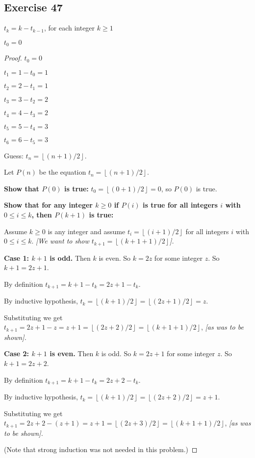 \documentclass[14pt]{extarticle}
\newcommand{\dps}{\displaystyle}
\newcommand{\floor}[1]{{\left\lfloor#1\right\rfloor}}
\begin{document}
\subsection{Exercise 47}
\(t_k = k - t_{k-1}\), for each integer \(k \geq 1\)

\(t_0 = 0\)

\begin{proof}
    \(t_0 = 0\)

    \(t_1 = 1 - t_0 = 1\)

    \(t_2 = 2 - t_1 = 1\)

    \(t_3 = 3 - t_2 = 2\)

    \(t_4 = 4 - t_3 = 2\)

    \(t_5 = 5 - t_4 = 3\)

    \(t_6 = 6 - t_5 = 3\)

    Guess: \(t_n = \floor{(n+1)/2}\).

    Let \(P(n)\) be the equation \(t_n = \floor{(n+1)/2}\).

        {\bf Show that $P(0)$ is true:} \(t_0 = \floor{(0+1)/2} = 0\), so $P(0)$ is true.

        {\bf Show that for any integer \(k \geq 0\) if $P(i)$ is true for all integers $i$ with \(0 \leq i \leq k\), then
            $P(k+1)$ is true:}

    Assume \(k \geq 0\) is any integer and assume \(t_i = \floor{(i+1)/2}\) for all integers $i$ with
    \(0 \leq i \leq k\). {\it [We want to show \(t_{k+1} = \floor{(k+1+1)/2}\)].}

        {\bf Case 1: $k+1$ is odd.} Then $k$ is even. So $k = 2z$ for some integer $z$. So $k+1 = 2z+1$.

    By definition \(t_{k+1} = k+1 - t_k = 2z+1 - t_k\).

    By inductive hypothesis, \(\dps t_k = \floor{(k+1)/2} = \floor{(2z+1)/2} = z\).

    Substituting we get \(\dps t_{k+1} = 2z+1 - z = z+1 = \floor{(2z+2)/2} = \floor{(k+1+1)/2}\),
    {\it [as was to be shown].}

        {\bf Case 2: $k+1$ is even.} Then $k$ is odd. So $k = 2z+1$ for some integer $z$. So $k+1 = 2z+2$.

    By definition \(t_{k+1} = k+1 - t_k = 2z+2 - t_k\).

    By inductive hypothesis, \(\dps t_k = \floor{(k+1)/2} = \floor{(2z+2)/2} = z+1\).

    Substituting we get \(\dps t_{k+1} = 2z+2 - (z+1) = z+1 = \floor{(2z+3)/2} = \floor{(k+1+1)/2}\),
    {\it [as was to be shown].}

    (Note that strong induction was not needed in this problem.)
\end{proof}
\end{document}
